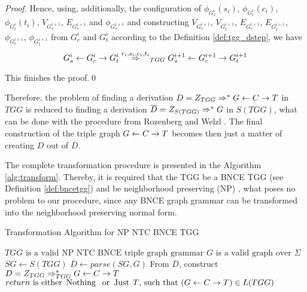 \documentclass[runningheads]{llncs}
\begin{document}
\begin{proof}
	Hence, using, additionally, the configuration of $\phi_{G^i_s}(s_i)$, $\phi_{G^i_c}(c_i)$, $\phi_{G^i_t}(t_i)$, $V_{G^{i+1}_s}$, $E_{G^{i+1}_s}$ and $\phi_{G^{i+1}_s}$ and constructing $V_{G^{i+1}_c}$, $V_{G^{i+1}_t}$, $E_{G^{i+1}_c}$, $E_{G^{i+1}_t}$, $\phi_{G^{i+1}_c}$, $\phi_{G^{i+1}_t}$ from $G^i_c$ and $G^i_t$ according to the Definition \ref{def:tgg_dstep}, we have 
	\begin{equation*}
		G^i_s \ms{} G^i_c \mt{} G^i_t \tderiv{r_i}{s_i,c_i,t_i}{TGG} G^{i+1}_s \ms{} G^{i+1}_c \mt{} G^{i+1}_t
	\end{equation*}
	
	This finishes the proof.\qed
\end{proof}

Therefore, the problem of finding a derivation $D = Z_{TGG} \Rightarrow^*_{} G \overset{}{\leftarrow} C \overset{}{\rightarrow} T$ in $\mathit{TGG}$ is reduced to finding a derivation $\overline{D} = Z_{S(TGG)} \Rightarrow^*_{} G$ in $S(TGG)$, what can be done with the procedure from Rozenberg and Welzl \cite{rozenberg1986boundary}. The final construction of the triple graph $G \overset{}{\leftarrow} C \overset{}{\rightarrow} T$ becomes then just a matter of creating $D$ out of $\overline{D}$.

The complete transformation procedure is presented in the Algorithm \ref{alg:transform}. Thereby, it is required that the TGG be a BNCE TGG (see Definition \ref{def:bncetgg}) and be neighborhood preserving (NP) \cite{rozenberg1986boundary,skodinis1998neighborhood}, what poses no problem to our procedure, since any BNCE graph grammar can be transformed into the neighborhood preserving normal form. 
\begin{algorithm}[h]
	\caption{Transformation Algorithm for NP NTC BNCE TGG}
	\begin{algorithmic}[h]
		\Require $\mathit{TGG} \text{ is a valid NP NTC BNCE triple graph grammar}$
		\Require $G \text{ is a valid graph over } \Sigma$
		\State $\mathit{SG} \gets S(TGG)$ 
		\State $\overline{D} \gets \mathit{parse}(\mathit{SG},G)$ 
		 
		\State From $\overline{D}$, construct $D = Z_{TGG} \Rightarrow^*_{TGG} G \overset{}{\leftarrow} C \overset{}{\rightarrow} T$  
		\State {}
		\Else
		\State \Return {$\Nothing$} 
		\EndIf
		\EndFunction 
		\Ensure $return \text{ is either } \operatorname{\text{Nothing}}\; \text{ or } \operatorname{\text{Just}}\; T \text{, such that } (G \overset{}{\leftarrow} C \overset{}{\rightarrow} T) \in L(TGG)$
	\end{algorithmic}
	\label{alg:transform}
\end{algorithm}
\end{document}
